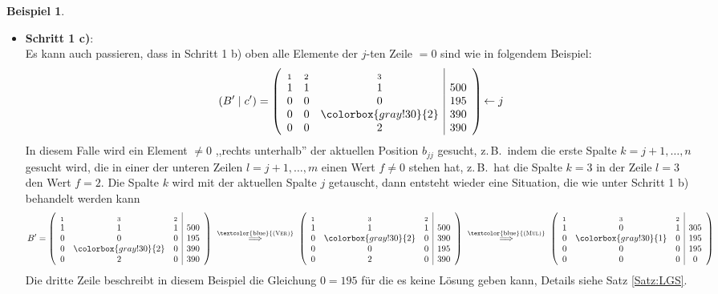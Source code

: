 \documentclass[a4paper,11pt,oneside]{article}
\theoremstyle{definition}
\newtheorem{example}{Beispiel}
\def\GB#1{\colorbox{gray!30}{#1}}
\def\OP#1{\textcolor{blue}{(\textnormal{\textrm{\textsc{#1}})}}}
\begin{document}
\begin{example}
\begin{enumerate}
\begin{itemize}
\item
\textbf{Schritt 1 c)}:~\\
Es kann auch passieren, dass in Schritt 1 b) oben alle Elemente der $j$-ten Zeile $=0$ sind wie in folgendem Beispiel:
\[
(B'\mid c')=\left(\begin{array}{ccc|c}
_1&_2&_3&\\
1&1&1&500\\
0&{0}&{0}&195\\
0&{0}&\GB{2}&390\\
0&{0}&2&390\\
\end{array}\right)
\begin{matrix}
~\\~\\\leftarrow j\\~\\~\\
\end{matrix}
\]
In diesem Falle wird ein Element $\neq0$ ,,rechts unterhalb'' der aktuellen Position $b_{jj}$ gesucht, z.\,B.\ indem die erste Spalte $k=j+1,\ldots,n$ gesucht wird, die in einer der unteren Zeilen $l=j+1,\ldots,m$ einen Wert $f\neq0$ stehen hat, z.\,B.\ hat die Spalte $k=3$ in der Zeile $l=3$ den Wert $f=2$. Die Spalte $k$ wird mit der aktuellen Spalte $j$ getauscht, dann entsteht wieder eine Situation, die wie unter Schritt 1 b) behandelt werden kann
\[
B'=\left(\begin{array}{ccc|c}
_1&_3&_2&\\
1&1&1&500\\
0&{0}&{0}&195\\
0&\GB{2}&{0}&390\\
0&2&{0}&390\\
\end{array}\right)
 \ \stackrel{\text{\OP{Ver}}}{\Longrightarrow}\
\left(\begin{array}{ccc|c}
_1&_3&_2&\\
1&1&1&500\\
0&\GB{2}&{0}&390\\
0&{0}&{0}&195\\
0&2&{0}&390\\
\end{array}\right)
 \ \stackrel{\text{\OP{Mul}}}{\Longrightarrow}\
\left(\begin{array}{ccc|c}
_1&_3&_2&\\
1&0&1&305\\
0&\GB{1}&{0}&195\\
0&{0}&{0}&195\\
0&0&{0}&0\\
\end{array}\right)
\]
Die dritte Zeile beschreibt in diesem Beispiel die Gleichung $0=195$ für die es keine Lösung geben kann, Details siehe Satz \ref{Satz:LGS}.


\end{itemize}
\end{enumerate}
\end{example}
\end{document}
